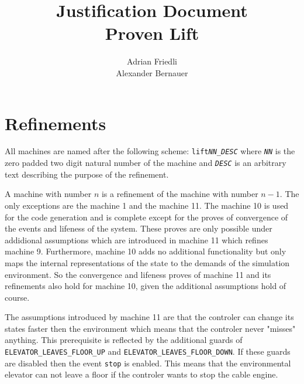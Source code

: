 \documentclass[a4paper,10pt]{article}
\title{Justification Document\\Proven Lift}
\author{Adrian Friedli\\Alexander Bernauer}
\begin{document}
\maketitle
\newpage

\section{Refinements}
All machines are named after the following scheme: {\tt lift{\em NN}\_{\em DESC}} where {\tt {\em NN}} is the zero padded two digit natural number of the machine and {\tt {\em DESC}} is an arbitrary text describing the purpose of the refinement.

A machine with number $n$ is a refinement of the machine with number $n-1$. The only exceptions are the machine 1 and the machine 11. The machine 10 is used for the code generation and is complete except for the proves of convergence of the events and lifeness of the system. These proves are only possible under addidional assumptions which are introduced in machine 11 which refines machine 9. Furthermore, machine 10 adds no additional functionality but only maps the internal representations of the state to the demands of the simulation environment. So the convergence and lifeness proves of machine 11 and its refinements also hold for machine 10, given the additional assumptions hold of course.

The assumptions introduced by machine 11 are that the controler can change its states faster then the environment which means that the controler never "misses" anything. This prerequisite is reflected by the additional guards of {\tt ELEVATOR\_LEAVES\_FLOOR\_UP} and {\tt ELEVATOR\_LEAVES\_FLOOR\_DOWN}. If these guards are disabled then the event {\tt stop} is enabled. This means that the environmental elevator can not leave a floor if the controler wants to stop the cable engine.
\end{document}
